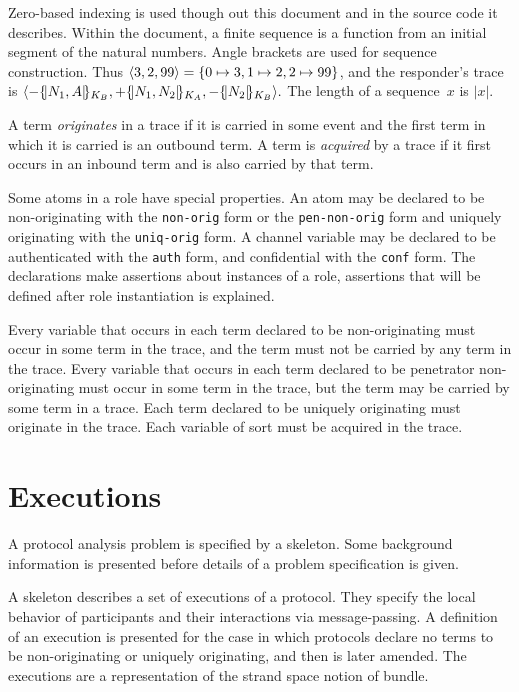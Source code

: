 \documentclass[12pt]{article}
\begin{document}
Zero-based indexing is used though out this document and in the source code
it describes.  Within the document, a finite sequence is a function
from an initial segment of the natural numbers.  Angle brackets are
used for sequence construction.  Thus $\langle3,2,99\rangle = \{0\mapsto 3,
1\mapsto 2, 2\mapsto 99\}$, and the responder's trace is
$\langle\mathord -\{\!|N_1, A|\!\}_{K_B}, \mathord +\{\!|N_1,
    N_2|\!\}_{K_A},\mathord -\{\!|N_2|\!\}_{K_B}\rangle.$ The length of a sequence~$x$ is
$|x|$.  \nocite{Dijkstra82}

A term \emph{originates} in a trace if it is
carried in some event and the first term in which it is
carried is an outbound term.  A term is
\emph{acquired} by a trace if it first occurs in an
inbound term and is also carried by that term.

Some atoms in a role have special properties.  An atom may be declared
to be non-originating with the \texttt{non-orig} form or the
\texttt{pen-non-orig} form and uniquely originating with the
\texttt{uniq-orig} form.  A channel variable may be declared to be
authenticated with the \texttt{auth} form, and confidential with the
\texttt{conf} form.  The declarations make assertions about instances
of a role, assertions that will be defined after role instantiation is
explained.

Every variable that occurs in each term declared to be non-originating
must occur in some term in the trace, and the term must not be carried
by any term in the trace.  Every variable that occurs in each term
declared to be penetrator non-originating must occur in some term in
the trace, but the term may be carried by some term in a trace.  Each
term declared to be uniquely originating must originate in the trace.
Each variable of sort  must be acquired in the trace.

\section{Executions}

A protocol analysis problem is specified by a skeleton.  Some
background information is presented before details of a problem
specification is given.

A skeleton describes a set of executions of a protocol.  They
specify the local behavior of participants and their interactions via
message-passing.  A definition of an execution is presented for the
case in which protocols declare no terms to be non-originating or
uniquely originating, and then is later amended.  The executions are a
representation of the strand space notion of bundle.
\end{document}
